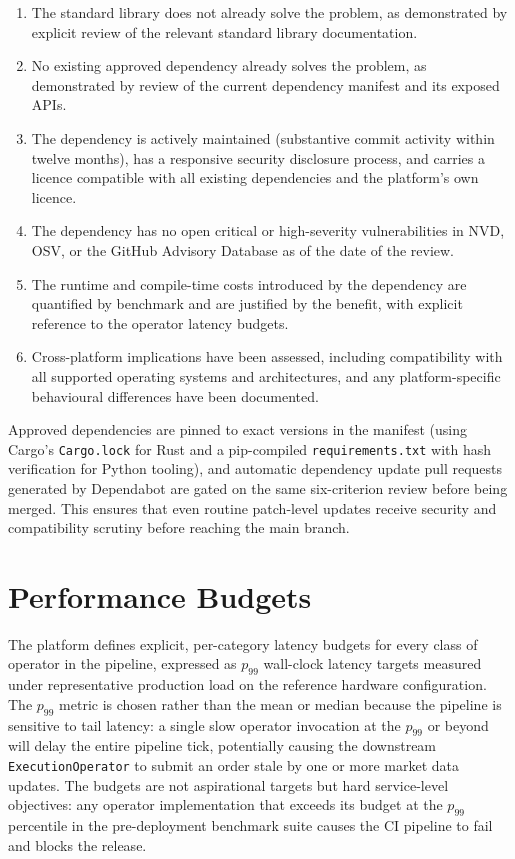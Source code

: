 \documentclass[12pt,openany]{book}
\numberwithin{equation}{chapter}
\theoremstyle{plain}
\theoremstyle{definition}
\theoremstyle{remark}
\begin{document}
\begin{enumerate}
    \item The standard library does not already solve the problem, as demonstrated by explicit review of the relevant standard library documentation.
    \item No existing approved dependency already solves the problem, as demonstrated by review of the current dependency manifest and its exposed APIs.
    \item The dependency is actively maintained (substantive commit activity within twelve months), has a responsive security disclosure process, and carries a licence compatible with all existing dependencies and the platform's own licence.
    \item The dependency has no open critical or high-severity vulnerabilities in NVD, OSV, or the GitHub Advisory Database as of the date of the review.
    \item The runtime and compile-time costs introduced by the dependency are quantified by benchmark and are justified by the benefit, with explicit reference to the operator latency budgets.
    \item Cross-platform implications have been assessed, including compatibility with all supported operating systems and architectures, and any platform-specific behavioural differences have been documented.
\end{enumerate}

Approved dependencies are pinned to exact versions in the manifest (using Cargo's \texttt{Cargo.lock} for Rust and a pip-compiled \texttt{requirements.txt} with hash verification for Python tooling), and automatic dependency update pull requests generated by Dependabot are gated on the same six-criterion review before being merged. This ensures that even routine patch-level updates receive security and compatibility scrutiny before reaching the main branch.

\section{Performance Budgets}
\label{sec:performance_budgets}

The platform defines explicit, per-category latency budgets for every class of operator in the pipeline, expressed as $p_{99}$ wall-clock latency targets measured under representative production load on the reference hardware configuration. The $p_{99}$ metric is chosen rather than the mean or median because the pipeline is sensitive to tail latency: a single slow operator invocation at the $p_{99}$ or beyond will delay the entire pipeline tick, potentially causing the downstream \texttt{ExecutionOperator} to submit an order stale by one or more market data updates. The budgets are not aspirational targets but hard service-level objectives: any operator implementation that exceeds its budget at the $p_{99}$ percentile in the pre-deployment benchmark suite causes the CI pipeline to fail and blocks the release.
\end{document}
